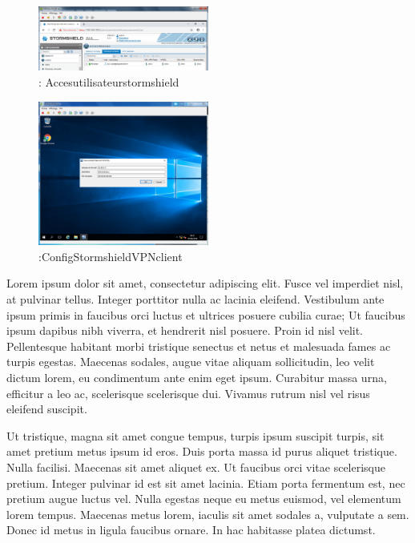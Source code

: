 \documentclass[a4paper,12pt]{report}
\begin{document}
\begin{figure}[H]

  \includegraphics[width=0.5\textwidth]{image/images/Accesutilisateurstormshield}
  \caption{: Accesutilisateurstormshield}
\end{figure}

\begin{figure}[H]

  \includegraphics[width=0.5\textwidth]{image/images/ConfigStormshieldVPNclient}
  \caption{:ConfigStormshieldVPNclient}
\end{figure}

Lorem ipsum dolor sit amet, consectetur adipiscing elit. Fusce vel imperdiet nisl, at pulvinar tellus. Integer porttitor nulla ac lacinia eleifend. Vestibulum ante ipsum primis in faucibus orci luctus et ultrices posuere cubilia curae; Ut faucibus ipsum dapibus nibh viverra, et hendrerit nisl posuere. Proin id nisl velit. Pellentesque habitant morbi tristique senectus et netus et malesuada fames ac turpis egestas. Maecenas sodales, augue vitae aliquam sollicitudin, leo velit dictum lorem, eu condimentum ante enim eget ipsum. Curabitur massa urna, efficitur a leo ac, scelerisque scelerisque dui. Vivamus rutrum nisl vel risus eleifend suscipit.

Ut tristique, magna sit amet congue tempus, turpis ipsum suscipit turpis, sit amet pretium metus ipsum id eros. Duis porta massa id purus aliquet tristique. Nulla facilisi. Maecenas sit amet aliquet ex. Ut faucibus orci vitae scelerisque pretium. Integer pulvinar id est sit amet lacinia. Etiam porta fermentum est, nec pretium augue luctus vel. Nulla egestas neque eu metus euismod, vel elementum lorem tempus. Maecenas metus lorem, iaculis sit amet sodales a, vulputate a sem. Donec id metus in ligula faucibus ornare. In hac habitasse platea dictumst.
\end{document}
